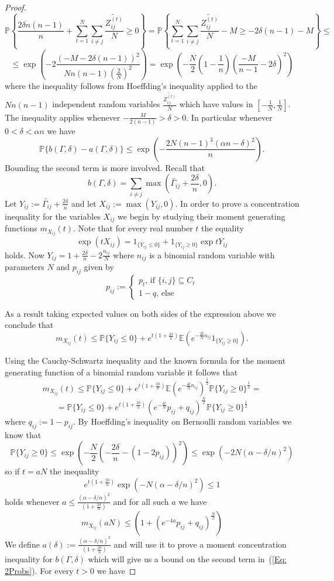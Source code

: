 \documentclass[12pt]{amsart}
\theoremstyle{remark}
\newcommand{\PP}{\mathbb{P}}
\newcommand{\EE}{\mathbb{E}}
\begin{document}
\begin{proof}
\[\PP\left\{\frac{2\delta n(n-1)}{n} + \sum_{t=1}^N \sum_{i\neq j} \frac{\widetilde{Z^{(t)}_{ij}}}{N}\geq 0\right\} = \PP\left\{\sum_{t=1}^N \sum_{i\neq j} \frac{\widetilde{Z^{(t)}_{ij}}}{N} - M \geq -2\delta (n-1) - M \right\}\leq\]
\[\leq \exp\left(-2\frac{(-M-2\delta(n-1))^2}{Nn(n-1)(\frac{2}{N})^2}\right)=\exp\left( -\frac{N}{2}\left(1-\frac{1}{n}\right) \left(\frac{-M}{n-1}-2\delta\right)^2\right) \]
where the inequality follows from Hoeffding's inequality applied to the $Nn(n-1)$ independent random variables $\frac{\widetilde{Z_{ij}^{(t)}}}{N}$ which have values in $\left[-\frac{1}{N},\frac{1}{N}\right]$. The inequality applies whenever $-\frac{M}{2(n-1)}>\delta>0$. In particular whenever $0<\delta<\alpha n$ we have
\[\PP\{b(\Gamma,\delta)-a(\Gamma,\delta)\}\leq \exp\left(-\frac{2N(n-1)^3(\alpha n-\delta)^2}{n}\right).\]
Bounding the second term is more involved. Recall that
\[b(\Gamma,\delta)=\sum_{i\neq j} \max\left(\widetilde{\Gamma_{ij}}+\frac{2\delta}{n},0\right).\]
Let $Y_{ij}:=\widetilde{\Gamma_{ij}}+\frac{2\delta}{n}$ and let $X_{ij}:=\max\left(Y_{ij},0\right)$. In order to prove a concentration inequality for the variables $X_{ij}$ we begin by studying their moment generating functions $m_{X_{ij}}(t)$. Note that for every real number $t$ the equality
\[\exp(tX_{ij})= 1_{\{Y_{ij}\leq 0\}} + 1_{\{Y_{ij}\geq 0\}} \exp tY_{ij}\]
holds. Now $Y_{ij}=1+\frac{2\delta}{n}-2\frac{n_{ij}}{N}$ where $n_{ij}$ is a binomial random variable with parameters $N$ and $p_{ij}$ given by
\[
p_{ij}:=\begin{cases}
p_t\text{, if $\{i,j\}\subseteq C_t$}\\
1-q\text{, else}
\end{cases}
\]


As a result taking expected values on both sides of the expression above we conclude that
\[ m_{X_{ij}}(t) \leq \PP\{Y_{ij}\leq 0\} + e^{t\left(1+\frac{2\delta}{n}\right)}\EE\left(e^{-\frac{2t}{N}n_{ij}}1_{\{Y_{ij}\geq 0\}}\right).\]

Using the Cauchy-Schwartz inequality and the known formula for the moment generating function of a binomial random variable it follows that
\[ m_{X_{ij}}(t)\leq \PP\{Y_{ij}\leq 0\}+ e^{t\left(1+\frac{2\delta}{n}\right)}\EE\left(e^{-\frac{4t}{N}n_{ij}}\right)^{\frac{1}{2}}\PP\{Y_{ij}\geq 0\}^{\frac{1}{2}}=\]
\[=\PP\{Y_{ij}\leq 0\}+ e^{t\left(1+\frac{2\delta}{n}\right)}\left(e^{-\frac{4t}{N}}p_{ij} + q_{ij}\right)^{\frac{N}{2}}\PP\{Y_{ij}\geq 0\}^{\frac{1}{2}}\]
where $q_{ij}:=1-p_{ij}$.
By Hoeffding's inequality on Bernoulli random variables we know that
\[\PP\{Y_{ij}\geq 0\}\leq \exp\left(-\frac{N}{2}\left(-\frac{2\delta}{n}-(1-2p_{ij})\right)^2 \right)\leq \exp\left(-2N(\alpha-\delta/n)^2\right)\]
so if $t=aN$ the inequality 
\[e^{t\left(1+\frac{2\delta}{n}\right)}\exp\left(-N(\alpha-\delta/n)^2\right)\leq 1\] 
holds whenever $a\leq \frac{(\alpha-\delta/n)^2}{\left(1+\frac{2\delta}{n}\right)}$ and for all such $a$ we have
\[m_{X_{ij}}(aN)\leq \left(1+ (e^{-4a}p_{ij}+q_{ij})^{\frac{N}{2}}\right)\]
We define $a(\delta):=\frac{(\alpha-\delta/n)^2}{\left(1+\frac{2\delta}{n}\right)}$ and will use it to prove a moment concentration inequality for $b(\Gamma,\delta)$ which will give us a bound on the second term in~(\ref{Eq: 2Probs}). For every $t>0$ we have


\end{proof}
\end{document}
